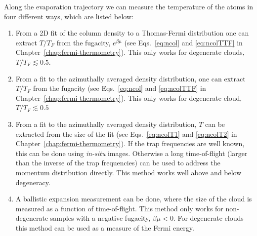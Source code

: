 Along the evaporation trajectory we can measure the temperature of the atoms in
four different ways, which are listed below:
\begin{enumerate}
 \item  From a 2D fit of the column density to a Thomas-Fermi distribution one
can extract $T/T_{F}$ from the fugacity, $e^{\beta\mu}$ (see Eqs.~\ref{eq:ncol}
and \ref{eq:ncolTTF} in Chapter~\ref{chap:fermi-thermometry}).  This only works
for degenerate clouds, $T/T_{F} \lesssim 0.5$.  

\item  From a fit to the azimuthally averaged density distribution, one can
extract $T/T_{F}$ from the fugacity (see Eqs.~\ref{eq:ncol} and
\ref{eq:ncolTTF} in Chapter~\ref{chap:fermi-thermometry}).  This only works for
degenerate cloud, $T/T_{F} \lesssim 0.5$

\item From a fit to the azimuthally averaged density distribution, $T$ can be
extracted from the size of the fit (see Eqs.~\ref{eq:ncolT1} and
\ref{eq:ncolT2} in Chapter~\ref{chap:fermi-thermometry}).  If the trap frequencies are well known,
this can be done using \textit{in-situ} images.  Otherwise a long
time-of-flight (larger than the inverse of the trap frequencies) can be used to
address the momentum distribution directly.   This method works well above and
below degeneracy. 

\item A ballistic expansion measurement can be done, where the size of the
cloud is measured as a function of time-of-flight.  This method only works for
non-degenerate samples with a negative fugacity, $\beta\mu < 0$.  For
degenerate clouds this method can be used as a measure of the Fermi energy. 
\end{enumerate} 

